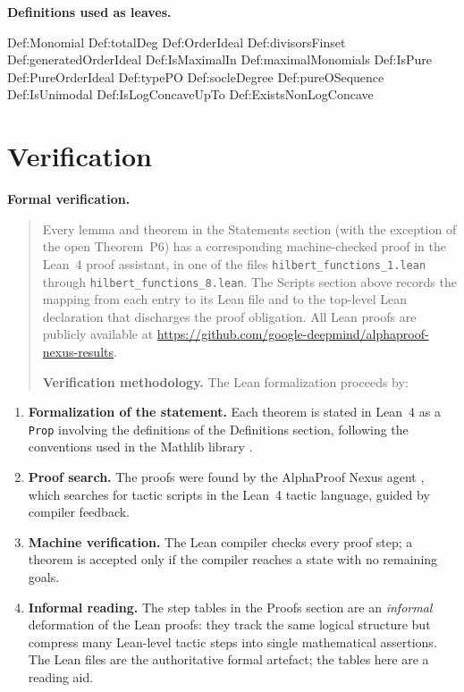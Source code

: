 \documentclass[11pt,reqno]{amsart}
\begin{document}
\medskip

\noindent%
\begin{minipage}[t]{\linewidth}
	\vspace{0pt}
	\textbf{Definitions used as leaves.}
	\smallskip
	\begin{verbatimbox}
		Def:Monomial        Def:totalDeg       Def:OrderIdeal
		Def:divisorsFinset  Def:generatedOrderIdeal
		Def:IsMaximalIn     Def:maximalMonomials
		Def:IsPure          Def:PureOrderIdeal Def:typePO
		Def:socleDegree     Def:pureOSequence  Def:IsUnimodal
		Def:IsLogConcaveUpTo Def:ExistsNonLogConcave
	\end{verbatimbox}
\end{minipage}

\section{Verification}

\label{sec:verification} \noindent \textbf{Formal verification.} 

\bigskip 

\begin{quotation}
\noindent%
Every lemma and theorem in the Statements section (with the exception of the
open Theorem~P6) has a corresponding machine-checked proof in the Lean~4
proof assistant, in one of the files \texttt{hilbert\_functions\_1.lean}
through \texttt{hilbert\_functions\_8.lean}. The Scripts section above
records the mapping from each entry to its Lean file and to the top-level
Lean declaration that discharges the proof obligation. All Lean proofs are
publicly available at %
\url{https://github.com/google-deepmind/alphaproof-nexus-results}.

\medskip \noindent \textbf{Verification methodology.} The Lean formalization
proceeds by:
\end{quotation}

\begin{enumerate}
\item \textbf{Formalization of the statement.} Each theorem is stated in
Lean~4 as a \texttt{Prop} involving the definitions of the Definitions
section, following the conventions used in the Mathlib library \cite%
{mathlib2020}.

\item \textbf{Proof search.} The proofs were found by the AlphaProof Nexus
agent \cite{tsoukalas2026}, which searches for tactic scripts in the Lean~4
tactic language, guided by compiler feedback.

\item \textbf{Machine verification.} The Lean compiler checks every proof
step; a theorem is accepted only if the compiler reaches a state with no
remaining goals.

\item \textbf{Informal reading.} The step tables in the Proofs section are
an \emph{informal} deformation of the Lean proofs: they track the same
logical structure but compress many Lean-level tactic steps into single
mathematical assertions. The Lean files are the authoritative formal
artefact; the tables here are a reading aid.
\end{enumerate}
\end{document}
